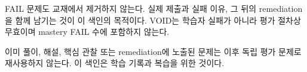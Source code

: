 \begin{notebox}[기록 해석]
FAIL 문제도 교재에서 제거하지 않는다. 실제 제출과 실패 이유, 그 뒤의 remediation을 함께 남기는 것이 이 색인의 목적이다. VOID는 학습자 실패가 아니라 평가 절차상 무효이며 mastery FAIL 수에 포함하지 않는다.
\end{notebox}

\begin{notebox}[평가 문제 재사용 주의]
이미 풀이, 해설, 핵심 관찰 또는 remediation에 노출된 문제는 이후 독립 평가 문제로 재사용하지 않는다. 이 색인은 학습 기록과 복습을 위한 것이다.
\end{notebox}
